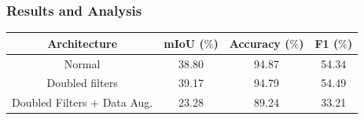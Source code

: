 \documentclass{beamer}
\begin{document}
\begin{frame}
\frametitle{Results and Analysis}

\begin{table}[h!]
  \begin{center}
    
    \begin{tabular}{|c|c|c|c|} %
      \textbf{Architecture} & \textbf{mIoU ($\%$)} & \textbf{Accuracy ($\%$)} & \textbf{F1 ($\%$)} \\
      \hline
      Normal & 38.80 & 94.87 & 54.34\\
      \hline
      Doubled filters & 39.17 & 94.79  & 54.49 \\  
      \hline
      Doubled Filters + Data Aug. & 23.28 & 89.24 & 33.21\\
    \end{tabular}

    \label{segnet:table1}
  \end{center}
\end{table}


\end{frame}
\end{document}
